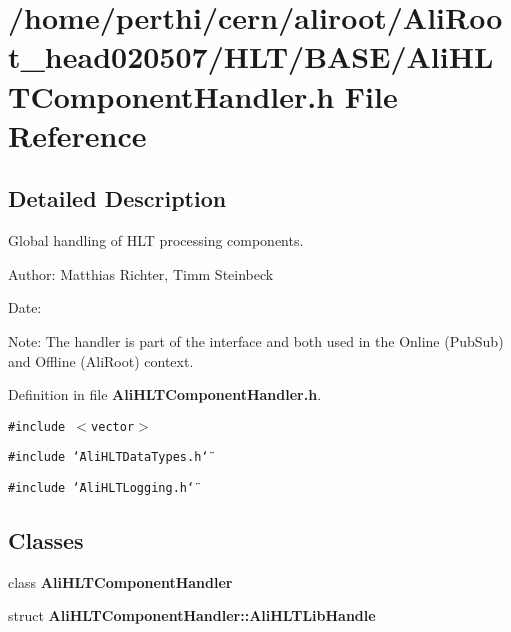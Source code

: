 \section{/home/perthi/cern/aliroot/Ali\-Root\_\-head020507/HLT/BASE/Ali\-HLTComponent\-Handler.h File Reference}
\label{AliHLTComponentHandler_8h}


\subsection{Detailed Description}
Global handling of HLT processing components. 

\begin{Desc}
\item[Author:]Matthias Richter, Timm Steinbeck \end{Desc}
\begin{Desc}
\item[Date:]\end{Desc}
\begin{Desc}
\item[Note:]The handler is part of the interface and both used in the Online (Pub\-Sub) and Offline (Ali\-Root) context.\end{Desc}


Definition in file {\bf Ali\-HLTComponent\-Handler.h}.

{\tt \#include $<$vector$>$}\par
{\tt \#include \char`\"{}Ali\-HLTData\-Types.h\char`\"{}}\par
{\tt \#include \char`\"{}Ali\-HLTLogging.h\char`\"{}}\par
\subsection*{Classes}
\begin{CompactItemize}
\item 
class {\bf Ali\-HLTComponent\-Handler}
\item 
struct {\bf Ali\-HLTComponent\-Handler::Ali\-HLTLib\-Handle}
\end{CompactItemize}
